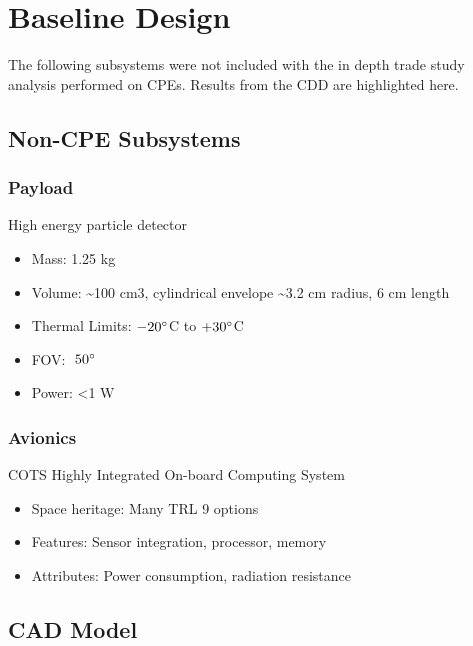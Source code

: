 
\section{Baseline Design}

The following subsystems were not included with the in depth trade study analysis performed on CPEs.  Results from the CDD are highlighted here.
\bigskip

\subsection{Non-CPE Subsystems}

\subsubsection{Payload} High energy particle detector
\begin{itemize}
    \item Mass: 1.25 kg
    \item Volume: \textasciitilde100 cm3, cylindrical envelope \textasciitilde3.2 cm radius, 6 cm length
    \item Thermal Limits: $-20\degree$C to $+30\degree$C
    \item FOV: $~50\degree$
    \item Power: <1 W
\end{itemize}

\subsubsection{Avionics}
COTS Highly Integrated On-board Computing System
\begin{itemize}[topsep=0pt]
    \item Space heritage: Many TRL 9 options
    \item Features: Sensor integration, processor, memory
    \item Attributes: Power consumption, radiation resistance
\end{itemize}

\subsection{CAD Model}
